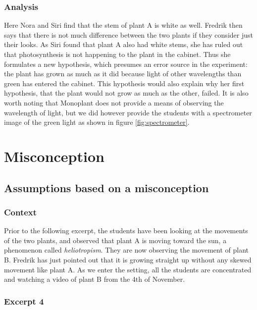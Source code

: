 \subsubsection*{Analysis}
Here Nora and Siri find that the stem of plant A is white as well. Fredrik then says that there is not much difference between the two plants if they consider just their looks. As Siri found that plant A also had white stems, she has ruled out that photosynthesis is not happening to the plant in the cabinet. Thus she formulates a new hypothesis, which presumes an error source in the experiment: the plant has grown as much as it did because light of other wavelengths than green has entered the cabinet.
This hypothesis would also explain why her first hypothesis, that the plant would not grow as much as the other, failed. It is also worth noting that Monoplant does not provide a means of observing the wavelength of light, but we did however provide the students with a spectrometer image of the green light as shown in figure \ref{fig:spectrometer}.

\section{Misconception}
\label{cha:guidedinquiry}


\subsection{Assumptions based on a misconception}

\subsubsection*{Context}
Prior to the following excerpt, the students have been looking at the movements of the two plants, and observed that plant A is moving toward the sun, a phenomenon called \emph{heliotropism}. They are now observing the movement of plant B. Fredrik has just pointed out that it is growing straight up without any skewed movement like plant A. As we enter the setting, all the students are concentrated and watching a video of plant B from the 4th of November.


\subsubsection*{Excerpt 4}\label{ex:excerpt4}

